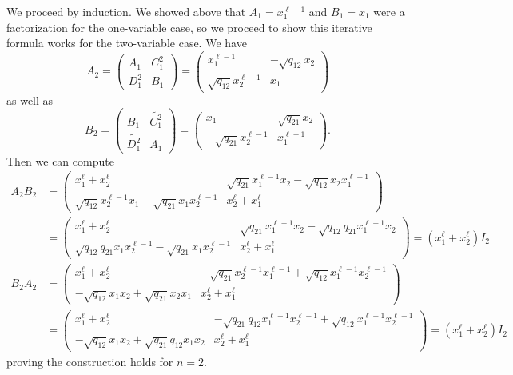 \documentclass [11pt, proquest] {uwthesis}[2020/02/24]
\begin{document}
    \begin{prf}
        We proceed by induction. We showed above that $A_1=x_1^{\ell -1}$ and $B_1=x_1$ were a factorization for the one-variable case, so we proceed to show this iterative formula works for the two-variable case. We have
        \[A_2=\begin{pmatrix}A_1 & C_1^2\\ D_1^2& B_1\end{pmatrix}=\begin{pmatrix}x_1^{\ell -1} & -\sqrt{q_{12}}x_2\\ \sqrt{q_{12}}x_2^{\ell -1} & x_1\end{pmatrix}\]
        as well as
        \[B_2=\begin{pmatrix}B_1 & \widetilde{C_1^2}\\\widetilde{D_1^2} & A_1\end{pmatrix}= \begin{pmatrix}x_1 & \sqrt{q_{21}}x_2\\ -\sqrt{q_{21}}x_2^{\ell -1} & x_1^{\ell -1}\end{pmatrix}.\]
        Then we can compute
        \begin{align*}
        A_2B_2&=\begin{pmatrix}x_1^\ell  + x_2^\ell  & \sqrt{q_{21}}x_1^{\ell -1}x_2 - \sqrt{q_{12}}x_2x_1^{\ell -1}\\
        \sqrt{q_{12}}x_2^{\ell -1}x_1 - \sqrt{q_{21}}x_1x_2^{\ell -1} & x_2^\ell +x_1^\ell \end{pmatrix}\\
        &=\begin{pmatrix}x_1^\ell  + x_2^\ell  & \sqrt{q_{21}}x_1^{\ell -1}x_2 - \sqrt{q_{12}}q_{21}x_1^{\ell -1}x_2\\
        \sqrt{q_{12}}q_{21}x_1x_2^{\ell -1} - \sqrt{q_{21}}x_1x_2^{\ell -1} & x_2^\ell +x_1^\ell \end{pmatrix}=(x_1^\ell+x_2^\ell)I_2
        \end{align*}
        \begin{align*}
        B_2A_2&=\begin{pmatrix}x_1^\ell  + x_2^\ell  & -\sqrt{q_{21}}x_2^{\ell -1}x_1^{\ell -1}+\sqrt{q_{12}}x_1^{\ell -1}x_2^{\ell -1}\\
        -\sqrt{q_{12}}x_1x_2 + \sqrt{q_{21}}x_2x_1 & x_2^\ell +x_1^\ell \end{pmatrix}\\
        &=\begin{pmatrix}x_1^\ell  + x_2^\ell  & -\sqrt{q_{21}}q_{12}x_1^{\ell -1}x_2^{\ell -1}+\sqrt{q_{12}}x_1^{\ell -1}x_2^{\ell -1}\\
        -\sqrt{q_{12}}x_1x_2 + \sqrt{q_{21}}q_{12}x_1x_2 & x_2^\ell +x_1^\ell \end{pmatrix}=(x_1^\ell+x_2^\ell)I_2
        \end{align*}
        proving the construction holds for $n=2$.
        

\end{prf}
\end{document}
